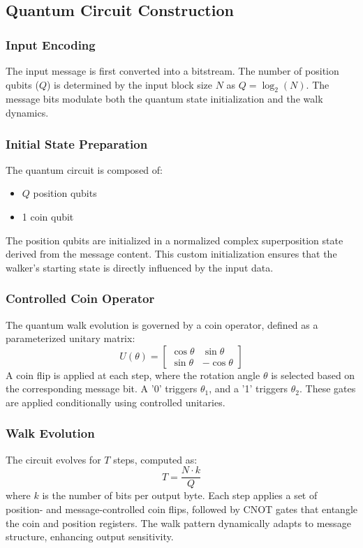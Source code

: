 \documentclass[conference]{IEEEtran}
\begin{document}
\subsection{Quantum Circuit Construction}

\subsubsection{Input Encoding}
The input message is first converted into a bitstream. The number of position qubits ($Q$) is determined by the input block size $N$ as $Q = \log_2(N)$. The message bits modulate both the quantum state initialization and the walk dynamics.

\subsubsection{Initial State Preparation}
The quantum circuit is composed of:
\begin{itemize}
    \item $Q$ position qubits
    \item 1 coin qubit
\end{itemize}
The position qubits are initialized in a normalized complex superposition state derived from the message content. This custom initialization ensures that the walker’s starting state is directly influenced by the input data.

\subsubsection{Controlled Coin Operator}
The quantum walk evolution is governed by a coin operator, defined as a parameterized unitary matrix:
\[
U(\theta) = \begin{bmatrix}
\cos \theta & \sin \theta \\
\sin \theta & -\cos \theta
\end{bmatrix}
\]
A coin flip is applied at each step, where the rotation angle $\theta$ is selected based on the corresponding message bit. A '0' triggers $\theta_1$, and a '1' triggers $\theta_2$. These gates are applied conditionally using controlled unitaries.

\subsubsection{Walk Evolution}
The circuit evolves for $T$ steps, computed as:
\[
T = \frac{N \cdot k}{Q}
\]
where $k$ is the number of bits per output byte. Each step applies a set of position- and message-controlled coin flips, followed by CNOT gates that entangle the coin and position registers. The walk pattern dynamically adapts to message structure, enhancing output sensitivity.
\end{document}
